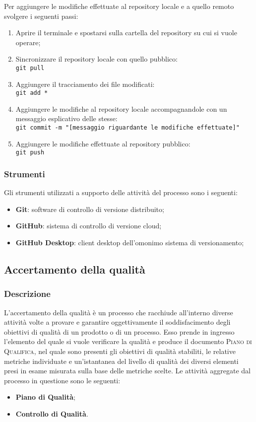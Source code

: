 Per aggiungere le modifiche effettuate al repository locale e a quello remoto svolgere i seguenti passi:
\begin{enumerate}
	\item Aprire il terminale e spostarsi sulla cartella del repository su cui si vuole operare;
	\item Sincronizzare il repository locale con quello pubblico:\\
		\texttt{git pull}
	\item Aggiungere il tracciamento dei file modificati:\\
		\texttt{git add *}
	\item Aggiungere le modifiche al repository locale accompagnandole con un messaggio esplicativo delle stesse:\\
		\texttt{git commit -m "[messaggio riguardante le modifiche effettuate]"}
	\item Aggiungere le modifiche effettuate al repository pubblico:\\
		\texttt{git push}
\end{enumerate}

\subsubsection{Strumenti}
\label{sub:gestione_configurazione:strumenti}

Gli strumenti utilizzati a supporto delle attività del processo sono i seguenti:
\begin{itemize}
	\item \textbf{Git}: software di controllo di versione distribuito;
	\item \textbf{GitHub}: sistema di controllo di versione cloud;
	\item \textbf{GitHub Desktop}: client desktop dell'omonimo sistema di versionamento;
\end{itemize}

\subsection{Accertamento della qualità}
\label{sub:accertamento_qualita}

\subsubsection{Descrizione}
L'accertamento della qualità è un processo che racchiude all'interno diverse attività volte a provare e garantire oggettivamente il
soddisfacimento degli obiettivi di qualità di un prodotto o di un processo. Esso prende in ingresso l'elemento del quale si vuole
verificare la qualità e produce il documento \textsc{Piano di Qualifica}, nel quale sono presenti gli obiettivi di qualità stabiliti, le
relative metriche individuate e un'istantanea del livello di qualità dei diversi elementi presi in esame misurata sulla base delle
metriche scelte. Le attività aggregate dal processo in questione sono le seguenti:
\begin{itemize}
    \item \textbf{Piano di Qualità};
    \item \textbf{Controllo di Qualità}.
\end{itemize}

